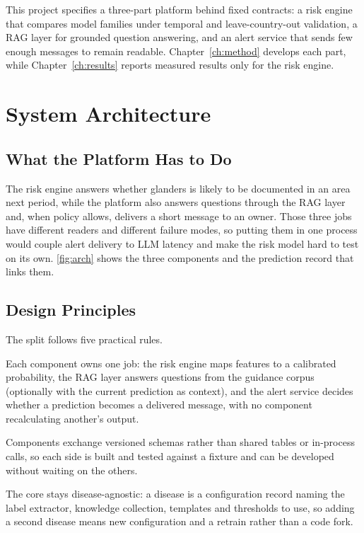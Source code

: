 \documentclass[10pt,openany]{report}
\begin{document}
This project specifies a three-part platform behind fixed contracts: a risk engine that compares
model families under temporal and leave-country-out validation, a RAG layer for grounded question
answering, and an alert service that sends few enough messages to remain readable.
Chapter~\ref{ch:method} develops each part, while Chapter~\ref{ch:results} reports
measured results only for the risk engine.

\chapter{System Architecture}
\label{ch:arch}

\section{What the Platform Has to Do}

The risk engine answers whether glanders is likely to be documented in an area next period, while
the platform also answers questions through the RAG layer and, when policy allows, delivers a short
message to an owner. Those three jobs have different readers and different failure modes, so putting
them in one process would couple alert delivery to LLM latency and make the risk model hard to test
on its own. \cref{fig:arch} shows the three components and the prediction record that links them.



\section{Design Principles}

The split follows five practical rules.

Each component owns one job: the risk engine maps features to a calibrated probability, the RAG
layer answers questions from the guidance corpus (optionally with the current prediction as context),
and the alert service decides whether a prediction becomes a delivered message, with no component
recalculating another's output.

Components exchange versioned schemas rather than shared tables or in-process calls, so each side is
built and tested against a fixture and can be developed without waiting on the others.

The core stays disease-agnostic: a disease is a configuration record naming the label extractor,
knowledge collection, templates and thresholds to use, so adding a second disease means new
configuration and a retrain rather than a code fork.
\end{document}

